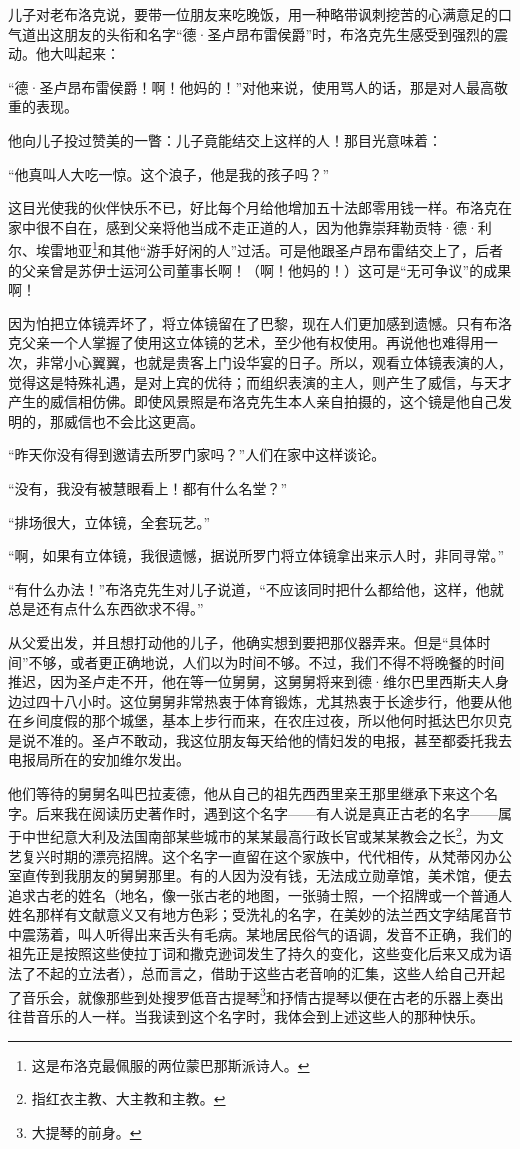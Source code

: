 \par 儿子对老布洛克说，要带一位朋友来吃晚饭，用一种略带讽刺挖苦的心满意足的口气道出这朋友的头衔和名字“德·圣卢昂布雷侯爵”时，布洛克先生感受到强烈的震动。他大叫起来：
\par “德·圣卢昂布雷侯爵！啊！他妈的！”对他来说，使用骂人的话，那是对人最高敬重的表现。
\par 他向儿子投过赞美的一瞥：儿子竟能结交上这样的人！那目光意味着：
\par “他真叫人大吃一惊。这个浪子，他是我的孩子吗？”
\par 这目光使我的伙伴快乐不已，好比每个月给他增加五十法郎零用钱一样。布洛克在家中很不自在，感到父亲将他当成不走正道的人，因为他靠崇拜勒贡特·德·利尔、埃雷地亚\footnote{这是布洛克最佩服的两位蒙巴那斯派诗人。}和其他“游手好闲的人”过活。可是他跟圣卢昂布雷结交上了，后者的父亲曾是苏伊士运河公司董事长啊！（啊！他妈的！）这可是“无可争议”的成果啊！
\par 因为怕把立体镜弄坏了，将立体镜留在了巴黎，现在人们更加感到遗憾。只有布洛克父亲一个人掌握了使用这立体镜的艺术，至少他有权使用。再说他也难得用一次，非常小心翼翼，也就是贵客上门设华宴的日子。所以，观看立体镜表演的人，觉得这是特殊礼遇，是对上宾的优待；而组织表演的主人，则产生了威信，与天才产生的威信相仿佛。即使风景照是布洛克先生本人亲自拍摄的，这个镜是他自己发明的，那威信也不会比这更高。
\par “昨天你没有得到邀请去所罗门家吗？”人们在家中这样谈论。
\par “没有，我没有被慧眼看上！都有什么名堂？”
\par “排场很大，立体镜，全套玩艺。”
\par “啊，如果有立体镜，我很遗憾，据说所罗门将立体镜拿出来示人时，非同寻常。”
\par “有什么办法！”布洛克先生对儿子说道，“不应该同时把什么都给他，这样，他就总是还有点什么东西欲求不得。”
\par 从父爱出发，并且想打动他的儿子，他确实想到要把那仪器弄来。但是“具体时间”不够，或者更正确地说，人们以为时间不够。不过，我们不得不将晚餐的时间推迟，因为圣卢走不开，他在等一位舅舅，这舅舅将来到德·维尔巴里西斯夫人身边过四十八小时。这位舅舅非常热衷于体育锻炼，尤其热衷于长途步行，他要从他在乡间度假的那个城堡，基本上步行而来，在农庄过夜，所以他何时抵达巴尔贝克是说不准的。圣卢不敢动，我这位朋友每天给他的情妇发的电报，甚至都委托我去电报局所在的安加维尔发出。
\par 他们等待的舅舅名叫巴拉麦德，他从自己的祖先西西里亲王那里继承下来这个名字。后来我在阅读历史著作时，遇到这个名字——有人说是真正古老的名字——属于中世纪意大利及法国南部某些城市的某某最高行政长官或某某教会之长\footnote{指红衣主教、大主教和主教。}，为文艺复兴时期的漂亮招牌。这个名字一直留在这个家族中，代代相传，从梵蒂冈办公室直传到我朋友的舅舅那里。有的人因为没有钱，无法成立勋章馆，美术馆，便去追求古老的姓名（地名，像一张古老的地图，一张骑士照，一个招牌或一个普通人姓名那样有文献意义又有地方色彩；受洗礼的名字，在美妙的法兰西文字结尾音节中震荡着，叫人听得出来舌头有毛病。某地居民俗气的语调，发音不正确，我们的祖先正是按照这些使拉丁词和撒克逊词发生了持久的变化，这些变化后来又成为语法了不起的立法者），总而言之，借助于这些古老音响的汇集，这些人给自己开起了音乐会，就像那些到处搜罗低音古提琴\footnote{大提琴的前身。}和抒情古提琴以便在古老的乐器上奏出往昔音乐的人一样。当我读到这个名字时，我体会到上述这些人的那种快乐。
